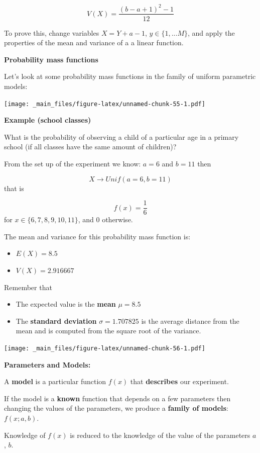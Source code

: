 \documentclass[
]{book}
\providecommand{\tightlist}{%
  \setlength{\itemsep}{0pt}\setlength{\parskip}{0pt}}
\begin{document}
\[V(X)= \frac{(b-a+1)^2-1}{12}\]

To prove this, change variables \(X=Y+a-1\), \(y \in \{1,...M\}\), and apply the properties of the mean and variance of a a linear function.

\textbf{Probability mass functions}

Let's look at some probability mass functions in the family of uniform parametric models:

\texttt{[image: \_main\_files/figure-latex/unnamed-chunk-55-1.pdf]}

\textbf{Example (school classes)}

What is the probability of observing a child of a particular age in a primary school (if all classes have the same amount of children)?

From the set up of the experiment we know: \(a=6\) and \(b=11\) then

\[X \rightarrow Unif(a=6, b=11)\] that is

\[f(x)=\frac{1}{6}\] for \(x\in \{6,7,8,9,10,11\}\), and \(0\) otherwise.

The mean and variance for this probability mass function is:

\begin{itemize}
\tightlist
\item
  \(E(X)=8.5\)
\item
  \(V(X)=2.916667\)
\end{itemize}

Remember that

\begin{itemize}
\item
  The expected value is the \textbf{mean} \(\mu=8.5\)
\item
  The \textbf{standard deviation} \(\sigma=1.707825\) is the average distance from the mean and is computed from the square root of the variance.
\end{itemize}

\texttt{[image: \_main\_files/figure-latex/unnamed-chunk-56-1.pdf]}

\textbf{Parameters and Models:}

A \textbf{model} is a particular function \(f(x)\) that \textbf{describes} our experiment.

If the model is a \textbf{known} function that depends on a few parameters then changing the values of the parameters, we produce a \textbf{family of models}: \(f(x; a,b)\).

Knowledge of \(f(x)\) is reduced to the knowledge of the value of the parameters \(a\), \(b\).
\end{document}
